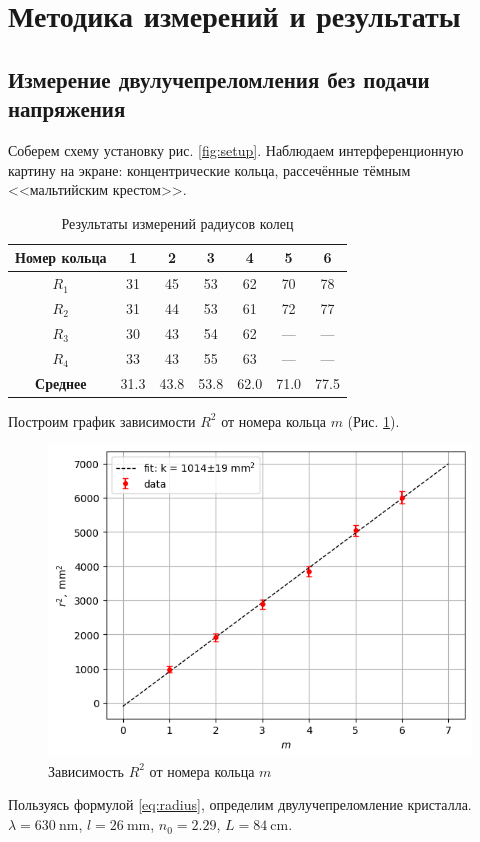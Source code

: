 \documentclass[12pt, a4paper]{article}
\newcommand{\mim}{~\mathrm{mm}}
\begin{document}
\section{Методика измерений и результаты}
\subsection{Измерение двулучепреломления без подачи напряжения}
Соберем схему установку рис. \ref{fig:setup}. Наблюдаем интерференционную
картину на экране: концентрические кольца, рассечённые тёмным <<мальтийским
крестом>>.

\begin{table}[h!]
    \centering
    \caption{Результаты измерений радиусов колец}
    \begin{tabular}{|c|c|c|c|c|c|c|}
        \hline
        Номер кольца     & 1    & 2    & 3    & 4    & 5    & 6    \\
        \hline
        $R_1$            & 31   & 45   & 53   & 62   & 70   & 78   \\
        \hline
        $R_2$            & 31   & 44   & 53   & 61   & 72   & 77   \\
        \hline
        $R_3$            & 30   & 43   & 54   & 62   & ---  & ---  \\
        \hline
        $R_4$            & 33   & 43   & 55   & 63   & ---  & ---  \\
        \hline
        \textbf{Среднее} & 31.3 & 43.8 & 53.8 & 62.0 & 71.0 & 77.5 \\
        \hline
    \end{tabular}
\end{table}

Построим график зависимости $R^2$ от номера кольца $m$ (Рис. \ref{fig:graph1}).
\begin{figure}[H]
    \centering
    \includegraphics[width=0.9\linewidth]{pics/plot.png}
    \caption{Зависимость $R^2$ от номера кольца $m$}
    \label{fig:graph1}
\end{figure}
Пользуясь формулой \eqref{eq:radius}, определим двулучепреломление кристалла.
$\lambda = 630~\mathrm{nm}$, $l = 26\mim$, $n_0 = 2.29$, $L = 84~\mathrm{cm}$.
\end{document}
